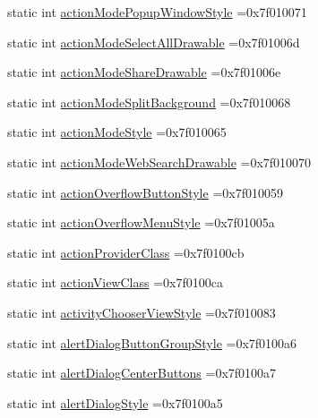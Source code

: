 \begin{DoxyCompactItemize}
\item 
static int \hyperlink{classandroid_1_1support_1_1design_1_1R_1_1attr_a3d81e37de48707c92845af1664325cc2}{action\+Mode\+Popup\+Window\+Style} =0x7f010071
\item 
static int \hyperlink{classandroid_1_1support_1_1design_1_1R_1_1attr_afd0f5aed05e8bb00730e84fb8bd500de}{action\+Mode\+Select\+All\+Drawable} =0x7f01006d
\item 
static int \hyperlink{classandroid_1_1support_1_1design_1_1R_1_1attr_ad6838a7f1f0cfe43673bb4251abc61c6}{action\+Mode\+Share\+Drawable} =0x7f01006e
\item 
static int \hyperlink{classandroid_1_1support_1_1design_1_1R_1_1attr_a23e600a698dd003c399ac9144d43cc86}{action\+Mode\+Split\+Background} =0x7f010068
\item 
static int \hyperlink{classandroid_1_1support_1_1design_1_1R_1_1attr_a586b72ccbb967f2df3c504d4bb611a90}{action\+Mode\+Style} =0x7f010065
\item 
static int \hyperlink{classandroid_1_1support_1_1design_1_1R_1_1attr_a06691df3ec2afae16de6a1473fa93551}{action\+Mode\+Web\+Search\+Drawable} =0x7f010070
\item 
static int \hyperlink{classandroid_1_1support_1_1design_1_1R_1_1attr_a3334a1bfcd970506bfaebf25b97ddb7c}{action\+Overflow\+Button\+Style} =0x7f010059
\item 
static int \hyperlink{classandroid_1_1support_1_1design_1_1R_1_1attr_a58c4106985af115965681fc784e511f3}{action\+Overflow\+Menu\+Style} =0x7f01005a
\item 
static int \hyperlink{classandroid_1_1support_1_1design_1_1R_1_1attr_af8e913202203f0fa6bb2fd297472c507}{action\+Provider\+Class} =0x7f0100cb
\item 
static int \hyperlink{classandroid_1_1support_1_1design_1_1R_1_1attr_ac560c622d91c1f3125e880765842e01a}{action\+View\+Class} =0x7f0100ca
\item 
static int \hyperlink{classandroid_1_1support_1_1design_1_1R_1_1attr_a1fd291fa96a1945e4080966723e44cef}{activity\+Chooser\+View\+Style} =0x7f010083
\item 
static int \hyperlink{classandroid_1_1support_1_1design_1_1R_1_1attr_a9b0a2f5e8a1665173335cee8864fe659}{alert\+Dialog\+Button\+Group\+Style} =0x7f0100a6
\item 
static int \hyperlink{classandroid_1_1support_1_1design_1_1R_1_1attr_a287951aa624e31d8150f3870825b706d}{alert\+Dialog\+Center\+Buttons} =0x7f0100a7
\item 
static int \hyperlink{classandroid_1_1support_1_1design_1_1R_1_1attr_a6d4a8d67ca4397ec898ae4f527b4ea45}{alert\+Dialog\+Style} =0x7f0100a5

\end{DoxyCompactItemize}
